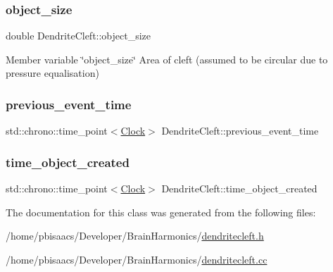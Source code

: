 \mbox{\label{classDendriteCleft_ac78e2502c53c1b3d0c2a759f3b653dde}} 
\subsubsection{\texorpdfstring{object\+\_\+size}{object\_size}}
{\footnotesize\ttfamily double Dendrite\+Cleft\+::object\+\_\+size\hspace{0.3cm}{\ttfamily [private]}}



Member variable \char`\"{}object\+\_\+size\char`\"{} Area of cleft (assumed to be circular due to pressure equalisation) 

\mbox{\label{classDendriteCleft_a97d85edbb69960d16398d212107c36fb}} 
\subsubsection{\texorpdfstring{previous\+\_\+event\+\_\+time}{previous\_event\_time}}
{\footnotesize\ttfamily std\+::chrono\+::time\+\_\+point$<$\mbox{\hyperlink{universe_8h_a0ef8d951d1ca5ab3cfaf7ab4c7a6fd80}{Clock}}$>$ Dendrite\+Cleft\+::previous\+\_\+event\+\_\+time\hspace{0.3cm}{\ttfamily [private]}}

\mbox{\label{classDendriteCleft_a145dcc0e5e2564e22464625930c006c9}} 
\subsubsection{\texorpdfstring{time\+\_\+object\+\_\+created}{time\_object\_created}}
{\footnotesize\ttfamily std\+::chrono\+::time\+\_\+point$<$\mbox{\hyperlink{universe_8h_a0ef8d951d1ca5ab3cfaf7ab4c7a6fd80}{Clock}}$>$ Dendrite\+Cleft\+::time\+\_\+object\+\_\+created\hspace{0.3cm}{\ttfamily [private]}}



The documentation for this class was generated from the following files\+:\begin{DoxyCompactItemize}
\item 
/home/pbisaacs/\+Developer/\+Brain\+Harmonics/\mbox{\hyperlink{dendritecleft_8h}{dendritecleft.\+h}}\item 
/home/pbisaacs/\+Developer/\+Brain\+Harmonics/\mbox{\hyperlink{dendritecleft_8cc}{dendritecleft.\+cc}}\end{DoxyCompactItemize}
